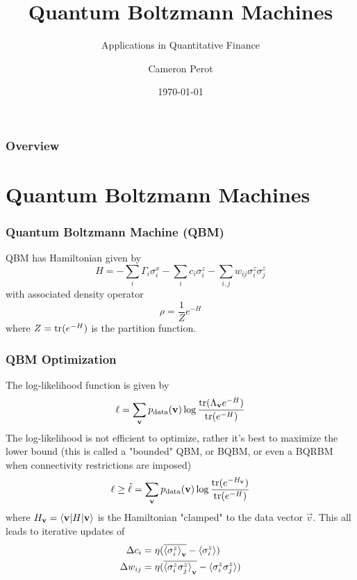 \documentclass{beamer}
\title{Quantum Boltzmann Machines}
\subtitle{Applications in Quantitative Finance}
\author{Cameron Perot}
\institute{JSC}
\date{\today}
\begin{document}

\maketitle


\begin{frame}
    \frametitle{Overview}
    \tableofcontents
\end{frame}


\section{Quantum Boltzmann Machines}

\begin{frame}
    \frametitle{Quantum Boltzmann Machine (QBM)}
    QBM has Hamiltonian given by
    \[
        H = -\sum_i \Gamma_i \sigma_i^x -\sum_i c_i \sigma_i^z - \sum_{i,j} w_{ij} \sigma_i^z \sigma_j^z
    \]
    with associated density operator
    \[
        \rho = \frac{1}{Z} e^{-H}
    \]
    where \( Z = \text{tr}(e^{-H}) \) is the partition function.
\end{frame}

\begin{frame}
    \frametitle{QBM Optimization}
    The log-likelihood function is given by
    \[
        \ell = \sum_{\mathbf{v}} p_{\text{data}}(\mathbf{v}) \log\frac{\text{tr}(\Lambda_{\mathbf{v}} e^{-H})}{\text{tr}(e^{-H})}
    \]
    The log-likelihood is not efficient to optimize, rather it's best to maximize the lower bound (this is called a "bounded" QBM, or BQBM, or even a BQRBM when connectivity restrictions are imposed)
    \[
        \ell \ge \tilde{\ell} = \sum_{\mathbf{v}} p_{\text{data}}(\mathbf{v}) \log\frac{\text{tr}(e^{-H_{\mathbf{v}}})}{\text{tr}(e^{-H})}
    \]
    where \( H_{\mathbf{v}} = \braket{\mathbf{v} | H | \mathbf{v}} \) is the Hamiltonian "clamped" to the data vector \( \vec{v} \).
    This all leads to iterative updates of
    \begin{align*}
        \Delta c_i
            &= \eta (\overline{\braket{\sigma_i^z}_{\mathbf{v}}} - \braket{\sigma_i^z}) \\
        \Delta w_{ij}
            &= \eta (\overline{\braket{\sigma_i^z\sigma_j^z}_{\mathbf{v}}} - \braket{\sigma_i^z\sigma_j^z})
    \end{align*}
\end{frame}
\end{document}
